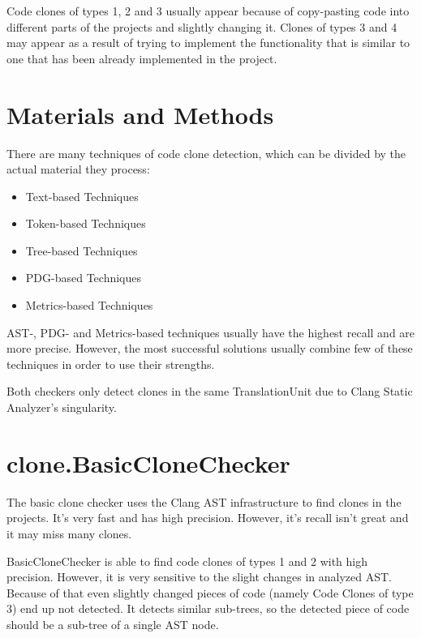\documentclass[a0,portrait]{a0poster}
\begin{document}
\begin{multicols}{2}
Code clones of types 1, 2 and 3 usually appear because of copy-pasting code into different parts
of the projects and slightly changing it. Clones of types 3 and 4 may appear as a result of
trying to implement the functionality that is similar to one that has been already implemented
in the project.


\section*{Materials and Methods}

There are many techniques of code clone detection, which can be divided by the actual material
they process:

\begin{itemize}
\item Text-based Techniques
\item Token-based Techniques
\item Tree-based Techniques
\item PDG-based Techniques
\item Metrics-based Techniques
\end{itemize}

AST-, PDG- and Metrics-based techniques usually have the highest recall and are more precise. 
However, the most successful solutions usually combine few of these techniques in order to use
their strengths.

Both checkers only detect clones in the same TranslationUnit due to Clang Static Analyzer's
singularity.


\section*{clone.BasicCloneChecker}

The basic clone checker uses the Clang AST infrastructure to find clones in the projects. It's
very fast and has high precision. However, it's recall isn't great and it may miss many clones.

BasicCloneChecker is able to find code clones of types 1 and 2 with high precision. However, it
is very sensitive to the slight changes in analyzed AST. Because of that even slightly changed 
pieces of code (namely Code Clones of type 3) end up not detected. It detects similar sub-trees, so
the detected piece of code should be a sub-tree of a single AST node.


\end{multicols}
\end{document}
